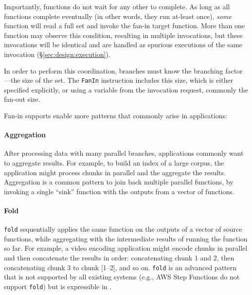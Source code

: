 Importantly, functions do not wait for any other to complete. As long as all
functions complete eventually (in other words, they run at-least once),
\emph{some} function will read a full set and invoke the fan-in target function.
More than one function may observe this condition, resulting in multiple
invocations, but these invocations will be identical and are handled as spurious
executions of the same invocation (\S\ref{sec:design:execution}).

In order to perform this coordination, branches must know the branching
factor---the size of the set. The \texttt{FanIn} instruction includes this size,
which is either specified explicitly, or using a variable from the invocation
request, commonly the fan-out size.


Fan-in supports enable more patterns that commonly arise in applications:

\paragraph{Aggregation}
After processing data with many parallel branches, applications commonly want to
aggregate results. For example, to build an index of a large corpus, the
application might process chunks in parallel and the aggregate the results.
Aggregation is a common pattern to join back multiple parallel functions, by
invoking a single ``sink'' function with the outputs from a vector of functions.

\paragraph{Fold}
\texttt{fold} sequentially applies the same function on the outputs of a vector
of source functions, while aggregating with the intermediate results of running
the function so far. For example, a video encoding application might encode
chunks in parallel and then concatenate the results in order: concatenating
chunk 1 and 2, then concatenating chunk 3 to chunk [1--2], and so on.
\texttt{fold} is an advanced pattern that is not supported by all existing
systems (e.g., AWS Step Functions do not support \texttt{fold}) but is
expressible in \name{}.


